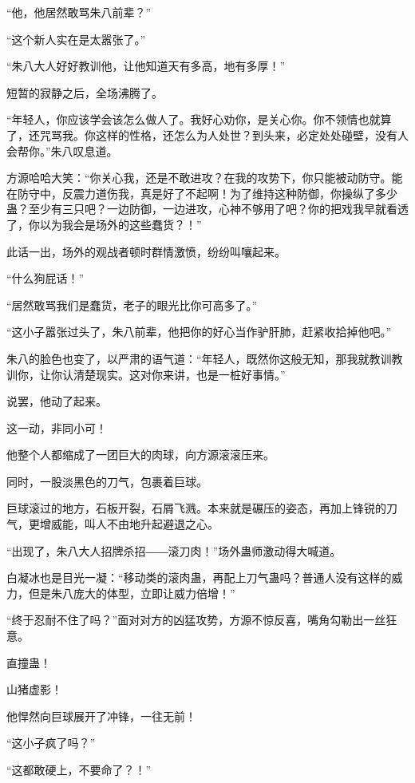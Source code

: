 
\begin{this_body}

“他，他居然敢骂朱八前辈？”

“这个新人实在是太嚣张了。”

“朱八大人好好教训他，让他知道天有多高，地有多厚！”

短暂的寂静之后，全场沸腾了。

“年轻人，你应该学会该怎么做人了。我好心劝你，是关心你。你不领情也就算了，还咒骂我。你这样的性格，还怎么为人处世？到头来，必定处处碰壁，没有人会帮你。”朱八叹息道。

方源哈哈大笑：“你关心我，还是不敢进攻？在我的攻势下，你只能被动防守。能在防守中，反震力道伤我，真是好了不起啊！为了维持这种防御，你操纵了多少蛊？至少有三只吧？一边防御，一边进攻，心神不够用了吧？你的把戏我早就看透了，你以为我会是场外的这些蠢货？！”

此话一出，场外的观战者顿时群情激愤，纷纷叫嚷起来。

“什么狗屁话！”

“居然敢骂我们是蠢货，老子的眼光比你可高多了。”

“这小子嚣张过头了，朱八前辈，他把你的好心当作驴肝肺，赶紧收拾掉他吧。”

朱八的脸色也变了，以严肃的语气道：“年轻人，既然你这般无知，那我就教训教训你，让你认清楚现实。这对你来讲，也是一桩好事情。”

说罢，他动了起来。

这一动，非同小可！

他整个人都缩成了一团巨大的肉球，向方源滚滚压来。

同时，一股淡黑色的刀气，包裹着巨球。

巨球滚过的地方，石板开裂，石屑飞溅。本来就是碾压的姿态，再加上锋锐的刀气，更增威能，叫人不由地升起避退之心。

“出现了，朱八大人招牌杀招――滚刀肉！”场外蛊师激动得大喊道。

白凝冰也是目光一凝：“移动类的滚肉蛊，再配上刀气蛊吗？普通人没有这样的威力，但是朱八庞大的体型，立即让威力倍增！”

“终于忍耐不住了吗？”面对对方的凶猛攻势，方源不惊反喜，嘴角勾勒出一丝狂意。

直撞蛊！

山猪虚影！

他悍然向巨球展开了冲锋，一往无前！

“这小子疯了吗？”

“这都敢硬上，不要命了？！”


\end{this_body}
